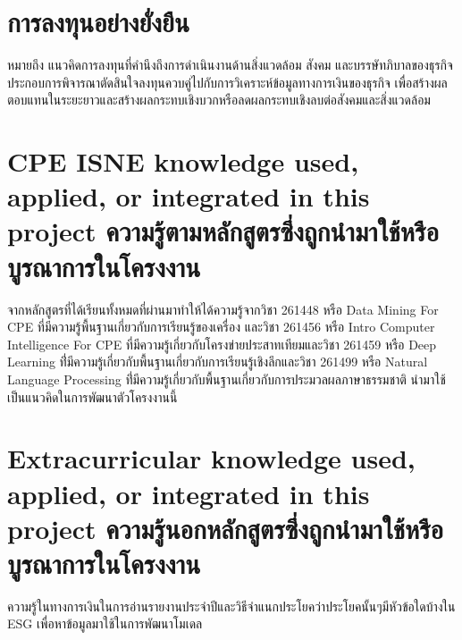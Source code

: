 \section{การลงทุนอย่างยั่งยืน}

\enskip \enskip \enskip หมายถึง แนวคิดการลงทุนที่คำนึงถึงการดำเนินงานด้านสิ่งแวดล้อม 
สังคม และบรรษัทภิบาลของธุรกิจประกอบการพิจารณาตัดสินใจลงทุนควบคู่ไปกับการวิเคราะห์ข้อมูลทางการเงินของธุรกิจ 
เพื่อสร้างผลตอบแทนในระยะยาวและสร้างผลกระทบเชิงบวกหรือลดผลกระทบเชิงลบต่อสังคมและสิ่งแวดล้อม

\section{\ifenglish%
\ifcpe CPE \else ISNE \fi knowledge used, applied, or integrated in this project
\else%
ความรู้ตามหลักสูตรซึ่งถูกนำมาใช้หรือบูรณาการในโครงงาน
\fi
}

\enskip \enskip \enskip จากหลักสูตรที่ได้เรียนทั้งหมดที่ผ่านมาทำให้ได้ความรู้จากวิชา 261448 หรือ Data Mining For CPE ที่มีความรู้พื้นฐานเกี่ยวกับการเรียนรู้ของเครื่อง และวิชา
261456 หรือ Intro Computer Intelligence For CPE ที่มีความรู้เกี่ยวกับโครงข่ายประสาทเทียมและวิชา
261459 หรือ Deep Learning ที่่มีความรู้เกี่ยวกับพื้นฐานเกี่ยวกับการเรียนรู้เชิงลึกและวิชา
261499 หรือ Natural Language Processing ที่่มีความรู้เกี่ยวกับพื้นฐานเกี่ยวกับการประมวลผลภาษาธรรมชาติ นำมาใช้เป็นแนวคิดในการพัฒนาตัวโครงงานนี้


\section{\ifenglish%
Extracurricular knowledge used, applied, or integrated in this project
\else%
ความรู้นอกหลักสูตรซึ่งถูกนำมาใช้หรือบูรณาการในโครงงาน
\fi
}

\enskip \enskip \enskip ความรู้ในทางการเงินในการอ่านรายงานประจำปีและวิธีจำแนกประโยคว่าประโยคนั้นๆมีหัวข้อใดบ้างใน ESG เพื่อหาข้อมูลมาใช้ในการพัฒนาโมเดล
